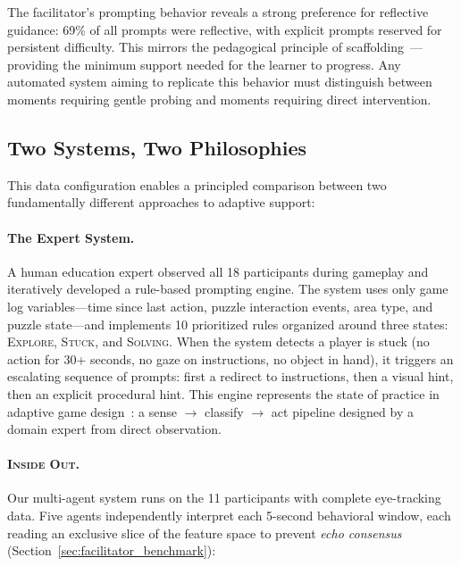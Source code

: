 The facilitator's prompting behavior reveals a strong preference for reflective guidance: 69\% of all prompts were reflective, with explicit prompts reserved for persistent difficulty. This mirrors the pedagogical principle of scaffolding~\cite{wood1976role}---providing the minimum support needed for the learner to progress. Any automated system aiming to replicate this behavior must distinguish between moments requiring gentle probing and moments requiring direct intervention.

\subsection{Two Systems, Two Philosophies}

This data configuration enables a principled comparison between two fundamentally different approaches to adaptive support:

\paragraph{The Expert System.} A human education expert observed all 18 participants during gameplay and iteratively developed a rule-based prompting engine. The system uses only game log variables---time since last action, puzzle interaction events, area type, and puzzle state---and implements 10 prioritized rules organized around three states: \textsc{Explore}, \textsc{Stuck}, and \textsc{Solving}. When the system detects a player is stuck (no action for 30+ seconds, no gaze on instructions, no object in hand), it triggers an escalating sequence of prompts: first a redirect to instructions, then a visual hint, then an explicit procedural hint. This engine represents the state of practice in adaptive game design~\cite{li2025adapting}: a sense $\rightarrow$ classify $\rightarrow$ act pipeline designed by a domain expert from direct observation.

\paragraph{\textsc{Inside Out}.} Our multi-agent system runs on the 11 participants with complete eye-tracking data. Five agents independently interpret each 5-second behavioral window, each reading an exclusive slice of the feature space to prevent \emph{echo consensus} (Section~\ref{sec:facilitator_benchmark}):

